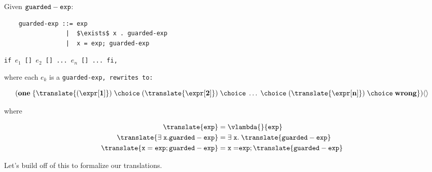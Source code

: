 \documentclass[]{article}
\begin{document}
Given $\tt{guarded-exp}$:

\begin{lstlisting}
    guarded-exp ::= exp
                 |  $\exists$ x . guarded-exp
                 |  x = exp; guarded-exp

\end{lstlisting}

\tt{if $e_1$ [] $e_2$ [] ... $e_n$ [] ... fi},

where each $e_k$ is a \tt{guarded-exp}, rewrites to: 

$$
(\bf{one}\; \{\translate{(\expr[1]})
\; \choice\; (\translate{\expr[2]}) 
\; \choice\; \dots\; \choice\; 
(\translate{\expr[n]}) 
\; \choice\; \bf{wrong} \})
 \langle\rangle  \\
$$  

where

\begin{align}    
    \translate{\tt{exp}} &= \vlambda{}{\tt{exp}} \\
    \translate{\exists\; \tt{x.guarded-exp}} 
    &= \exists\; \tt{x.}\; \translate{\tt{guarded-exp}} \\
    \translate{\tt{x = exp; guarded-exp}} 
    &= \tt{x = } \tt{exp}; \translate{\tt{guarded-exp}}
\end{align}

Let's build off of this to formalize our translations. 
\end{document}
